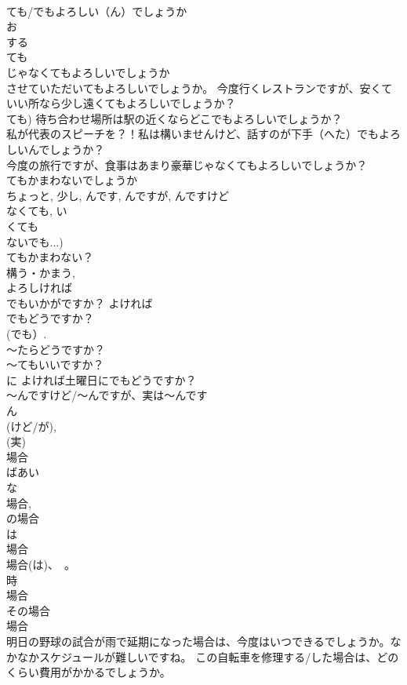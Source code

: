 \documentclass[8pt]{extreport}
\begin{document}
\begin{CJK}{UTF8}{min}
\\	ても/でもよろしい（ん）でしょうか	
\\	お
\\	する 
\\	ても 
\\	じゃなくてもよろしいでしょうか 
\\	させていただいてもよろしいでしょうか。 今度行くレストランですが、安くていい所なら少し遠くてもよろしいでしょうか？ 
\\	ても) 待ち合わせ場所は駅の近くならどこでもよろしいでしょうか？ 
\\	私が代表のスピーチを？！私は構いませんけど、話すのが下手（へた）でもよろしいんでしょうか？ 
\\	今度の旅行ですが、食事はあまり豪華じゃなくてもよろしいでしょうか？ 
\\	てもかまわないでしょうか 
\\	ちょっと, 少し, んです, んですが, んですけど 
\\	なくても, い
\\	くても 
\\	ないでも...) 
\\	てもかまわない？ 
\\	構う・かまう, 
\\	よろしければ
\\	でもいかがですか？ よければ
\\	でもどうですか？　
\\	(でも）. 
\\	～たらどうですか？　
\\	～てもいいですか？ 
\\	に よければ土曜日にでもどうですか？
\\	～んですけど/～んですが、実は～んです	
\\	ん
\\	(けど/が), 
\\	(実) 
\\	場合	
\\	ばあい 
\\	な
\\	場合, 
\\	の場合 
\\	は 
\\	場合 
\\	場合(は)、~。 
\\	時 
\\	場合 
\\	その場合 
\\	場合 
\\	明日の野球の試合が雨で延期になった場合は、今度はいつできるでしょうか。なかなかスケジュールが難しいですね。 この自転車を修理する/した場合は、どのくらい費用がかかるでしょうか。

\end{CJK}
\end{document}

